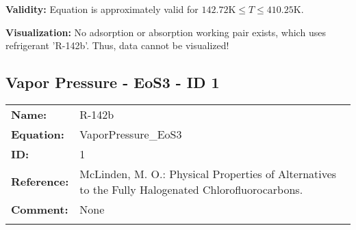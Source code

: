\textbf{Validity:}
\newline
Equation is approximately valid for $142.72 \si{\kelvin} \leq T \leq 410.25 \si{\kelvin}$.
\newline

\textbf{Visualization:}
%
\newline
No adsorption or absorption working pair exists, which uses refrigerant 'R-142b'. Thus, data cannot be visualized!
%

\FloatBarrier
\newpage
\subsection{Vapor Pressure - EoS3 - ID 1}
%
\begin{tabular}[l]{|lp{11.5cm}|}
\hline
\addlinespace

\textbf{Name:} & R-142b \\
\textbf{Equation:} & VaporPressure\_EoS3 \\
\textbf{ID:} & 1 \\
\textbf{Reference:} & McLinden, M. O.: Physical Properties of Alternatives to the Fully Halogenated Chlorofluorocarbons. \\
\textbf{Comment:} & None \\

\addlinespace
\hline
\end{tabular}
\newline

